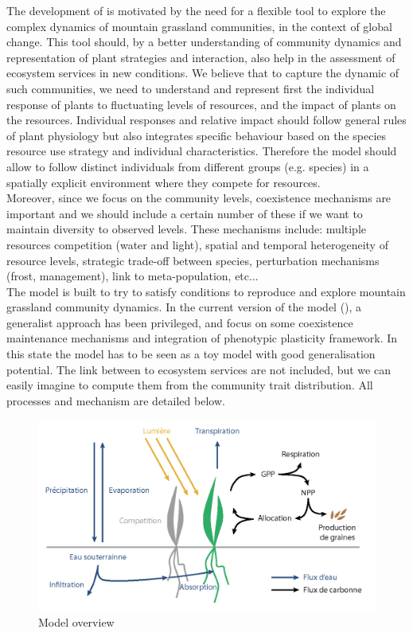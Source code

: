 The development of \model is motivated by the need for a flexible tool to explore the complex dynamics of mountain grassland communities, in the context of global change. This tool should, by a better understanding of community dynamics and representation of plant strategies and interaction, also help in the assessment of ecosystem services in new conditions. We believe that to capture the dynamic of such communities, we need to understand and represent first the individual response of plants  to fluctuating levels of resources, and the impact of plants on the resources. Individual responses and relative impact should follow general rules of plant physiology but also integrates specific behaviour based on the species resource use strategy and individual characteristics. Therefore the model should allow to follow distinct individuals from different groups (e.g. species) in a spatially explicit environment where they compete for resources.\\
\indent Moreover, since we focus on the community levels, coexistence mechanisms are important and we should include a certain number of these if we want to maintain diversity to observed levels. These mechanisms include: multiple resources competition (water and light), spatial and temporal heterogeneity of resource levels, strategic trade-off between species, perturbation mechanisms (frost, management), link  to meta-population, etc...\\
\indent The model is built to try to satisfy conditions to reproduce and explore mountain grassland community dynamics. In the current version of the model (\version), a generalist approach has been privileged, and focus on some coexistence maintenance mechanisms and integration of phenotypic plasticity framework. In this state the model has to be seen as a toy model with good generalisation potential. The link between to ecosystem services are not included, but we can easily imagine to compute them from the community trait distribution. All processes and mechanism are detailed below.

\begin{figure}
\includegraphics{./Figures/overview_model_t.png}
\caption{Model overview}
\end{figure}


